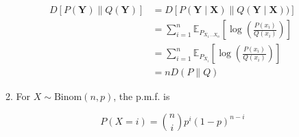 \documentclass[a4paper]{article}
\begin{document}
\begin{enumerate}
\begin{enumerate}
      \begin{equation}
        \begin{aligned}
          D\left[P(\boldsymbol{Y}) \| Q(\boldsymbol{Y})\right] &= D\left[P(\boldsymbol{Y} \mid \boldsymbol{X} )\| Q(\boldsymbol{Y} \mid \boldsymbol{X} ) )\right] \\
          & = \sum_{i=1}^n \mathbb{E}_{P_{X_{1} \ldots X_{n}}} \left[\log \left(\frac{ P\left(x_{i}\right)}{ Q\left(x_{i}\right)}\right)\right] \\
          & = \sum_{i=1}^n \mathbb{E}_{P_{X_{i}}} \left[\log \left(\frac{ P\left(x_{i}\right)}{ Q\left(x_{i}\right)}\right)\right] \\ 
          & = nD(P \| Q)
        \end{aligned}
      \end{equation}

      



       \item For $X\sim \text{Binom}(n,p)$, the p.m.f. is 
       
       \begin{equation}
         P(X=i) = \binom{n}{i}p^i (1-p)^{n-i}
       \end{equation}


\end{enumerate}
\end{enumerate}
\end{document}
